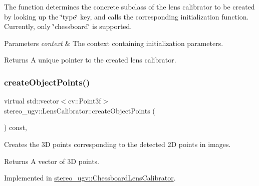 The function determines the concrete subclass of the lens calibrator to be created by looking up the \char`\"{}type\char`\"{} key, and calls the corresponding initialization function. Currently, only \char`\"{}chessboard\char`\"{} is supported. 
\begin{DoxyParams}{Parameters}
{\em context} & The context containing initialization parameters. \\
\hline
\end{DoxyParams}
\begin{DoxyReturn}{Returns}
A unique pointer to the created lens calibrator. 
\end{DoxyReturn}
\mbox{\label{classstereo__ugv_1_1LensCalibrator_a3edf81dfc9567904a0d1a7c3555d65bf}} 
\subsubsection{\texorpdfstring{create\+Object\+Points()}{createObjectPoints()}}
{\footnotesize\ttfamily virtual std\+::vector$<$cv\+::\+Point3f$>$ stereo\+\_\+ugv\+::\+Lens\+Calibrator\+::create\+Object\+Points (\begin{DoxyParamCaption}{ }\end{DoxyParamCaption}) const\hspace{0.3cm}{\ttfamily [protected]}, {}}



Creates the 3D points corresponding to the detected 2D points in images. 

\begin{DoxyReturn}{Returns}
A vector of 3D points. 
\end{DoxyReturn}


Implemented in \hyperlink{classstereo__ugv_1_1ChessboardLensCalibrator_adaeaa9e0a3203872ea8e5ef5b3482f7e}{stereo\+\_\+ugv\+::\+Chessboard\+Lens\+Calibrator}.

\mbox{\label{classstereo__ugv_1_1LensCalibrator_a9be834b0ef2983af47ac5f9dd67887fe}} 
